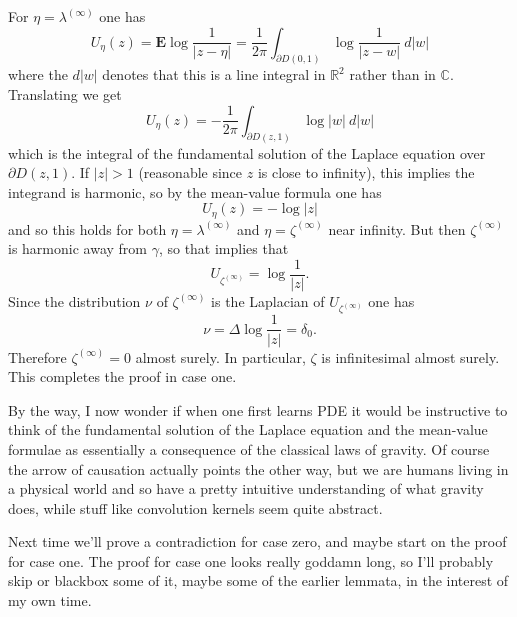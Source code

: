 \documentclass[12pt]{article}
\newcommand{\RR}{\mathbb{R}}
\newcommand{\CC}{\mathbb{C}}
\begin{document}
For $\eta = \lambda^{(\infty)}$ one has
$$U_\eta(z) = \mathbf E \log \frac{1}{|z - \eta|} = \frac{1}{2\pi} \int_{\partial D(0, 1)} \log \frac{1}{|z - w|} ~d|w|$$
where the $d|w|$ denotes that this is a line integral in $\RR^2$ rather than in $\CC$.
Translating we get
$$U_\eta(z) =- \frac{1}{2\pi} \int_{\partial D(z, 1)} \log |w| ~d|w|$$
which is the integral of the fundamental solution of the Laplace equation over $\partial D(z, 1)$.
If $|z| > 1$ (reasonable since $z$ is close to infinity), this implies the integrand is harmonic, so by the mean-value formula one has
$$U_\eta(z) = -\log |z|$$
and so this holds for both $\eta = \lambda^{(\infty)}$ and $\eta = \zeta^{(\infty)}$ near infinity.
But then $\zeta^{(\infty)}$ is harmonic away from $\gamma$, so that implies that
$$U_{\zeta^{(\infty)}} = \log \frac{1}{|z|}.$$
Since the distribution $\nu$ of $\zeta^{(\infty)}$ is the Laplacian of $U_{\zeta^{(\infty)}}$ one has
$$\nu = \Delta \log \frac{1}{|z|} = \delta_0.$$
Therefore $\zeta^{(\infty)} = 0$ almost surely.
In particular, $\zeta$ is infinitesimal almost surely. This completes the proof in case one.

By the way, I now wonder if when one first learns PDE it would be instructive to think of the fundamental solution of the Laplace equation and the mean-value formulae as essentially a consequence of the classical laws of gravity.
Of course the arrow of causation actually points the other way, but we are humans living in a physical world and so have a pretty intuitive understanding of what gravity does, while stuff like convolution kernels seem quite abstract.

Next time we'll prove a contradiction for case zero, and maybe start on the proof for case one.
The proof for case one looks really goddamn long, so I'll probably skip or blackbox some of it, maybe some of the earlier lemmata, in the interest of my own time.  




\end{document}
